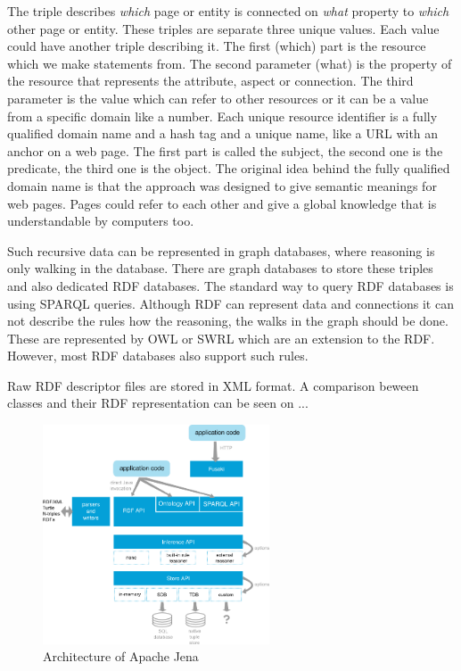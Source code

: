The triple describes \textit{which} page or entity is connected on \textit{what} property to \textit{which} other page or entity. These triples are separate three unique values. 
Each value could have another triple describing it. The first (which) part is the resource  which we make statements from. The second parameter (what) is the property of the resource that represents the attribute, aspect or connection. The third parameter is the value which can refer to other resources or it can be a value from a specific domain like a number.
Each unique resource identifier is a fully qualified domain name and a hash tag and a unique name, like a URL with an anchor on a web page. The first part is called the subject, the second one is the predicate, the third one is the object. 
The original idea behind the fully qualified domain name is that the approach was designed to give semantic meanings for web pages. 
Pages could refer to each other and give a global knowledge that is understandable by computers too. 

Such recursive data can be represented in graph databases, where reasoning is only walking in the database. There are graph databases to store these triples and also dedicated RDF databases. The standard way to query RDF databases is using SPARQL queries. Although RDF can represent data and connections it can not describe the rules how the reasoning, the walks in the graph should be done. These are represented by OWL or SWRL which are an extension to the RDF. However, most RDF databases also support such rules.

Raw RDF descriptor files are stored in XML format. A comparison beween classes and their RDF representation can be seen on ...


\begin{figure}[h]
\centering
\includegraphics[width=0.6\textwidth]{figures/jena-architecture.png}
\caption{Architecture of Apache Jena\label{fig:jena}}
\end{figure}


